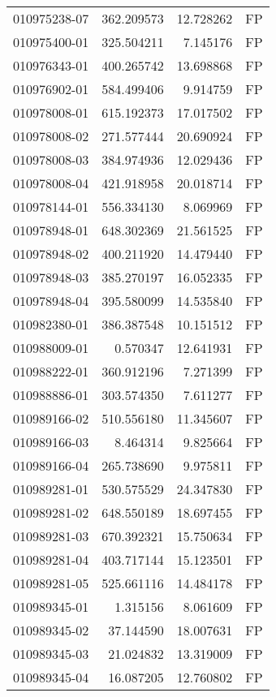 \begin{tabular}{lrrl}
010975238-07 &  362.209573 &    12.728262 &   FP \\
010975400-01 &  325.504211 &     7.145176 &   FP \\
010976343-01 &  400.265742 &    13.698868 &   FP \\
010976902-01 &  584.499406 &     9.914759 &   FP \\
010978008-01 &  615.192373 &    17.017502 &   FP \\
010978008-02 &  271.577444 &    20.690924 &   FP \\
010978008-03 &  384.974936 &    12.029436 &   FP \\
010978008-04 &  421.918958 &    20.018714 &   FP \\
010978144-01 &  556.334130 &     8.069969 &   FP \\
010978948-01 &  648.302369 &    21.561525 &   FP \\
010978948-02 &  400.211920 &    14.479440 &   FP \\
010978948-03 &  385.270197 &    16.052335 &   FP \\
010978948-04 &  395.580099 &    14.535840 &   FP \\
010982380-01 &  386.387548 &    10.151512 &   FP \\
010988009-01 &    0.570347 &    12.641931 &   FP \\
010988222-01 &  360.912196 &     7.271399 &   FP \\
010988886-01 &  303.574350 &     7.611277 &   FP \\
010989166-02 &  510.556180 &    11.345607 &   FP \\
010989166-03 &    8.464314 &     9.825664 &   FP \\
010989166-04 &  265.738690 &     9.975811 &   FP \\
010989281-01 &  530.575529 &    24.347830 &   FP \\
010989281-02 &  648.550189 &    18.697455 &   FP \\
010989281-03 &  670.392321 &    15.750634 &   FP \\
010989281-04 &  403.717144 &    15.123501 &   FP \\
010989281-05 &  525.661116 &    14.484178 &   FP \\
010989345-01 &    1.315156 &     8.061609 &   FP \\
010989345-02 &   37.144590 &    18.007631 &   FP \\
010989345-03 &   21.024832 &    13.319009 &   FP \\
010989345-04 &   16.087205 &    12.760802 &   FP \\

\end{tabular}
